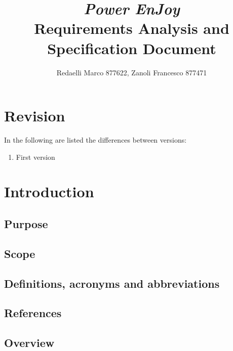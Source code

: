 \documentclass[]{report}
\title{{\Huge\textit{Power EnJoy}}\\{\LARGE Requirements Analysis and Specification Document}}
\author{Redaelli Marco 877622, Zanoli Francesco 877471}
\begin{document}
\maketitle

\chapter*{Revision}
In the following are listed the differences between versions:
\begin{enumerate}
	\item First version
\end{enumerate}

\tableofcontents

\chapter{Introduction}

\section{Purpose}


\section{Scope}


\section{Definitions, acronyms and abbreviations}


\section{References}


\section{Overview}

\end{document}
